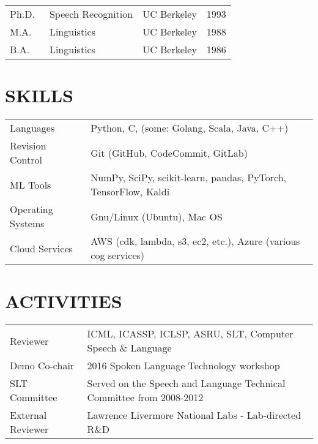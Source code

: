 \documentclass[11pt]{res} %
\newcommand{\mysection}[1]{%
	\pagebreak[0]\section{#1}\vspace{1em}
}
\begin{document}
\begin{resume}
\begin{tabular}{llcc}
  Ph.D.\ & Speech Recognition & UC Berkeley & 1993 \\[.5em]
  M.A.\ & Linguistics & UC Berkeley & 1988 \\[.5em]
  B.A.\ & Linguistics & UC Berkeley & 1986
\end{tabular}

 
\mysection{SKILLS}

\begin{tabular}{ll}
Languages & Python, C, (some: Golang, Scala, Java, C++)  \\[.5em]
Revision Control & Git (GitHub, CodeCommit, GitLab) \\[.5em]
ML Tools & NumPy, SciPy, scikit-learn, pandas, PyTorch, TensorFlow, Kaldi \\[.5em]
Operating Systems &	Gnu/Linux (Ubuntu), Mac OS \\[.5em]
Cloud Services & AWS (cdk, lambda, s3, ec2, etc.), Azure (various cog services)

\end{tabular}
	

\mysection{ACTIVITIES}

\begin{tabular}{ll}
  Reviewer & ICML, ICASSP, ICLSP, ASRU, SLT, Computer Speech \& Language \\[.5em]
  Demo Co-chair & 2016 Spoken Language Technology workshop \\[.5em]
  SLT Committee & Served on the Speech and Language Technical Committee from 2008-2012 \\[.5em]
  External Reviewer & Lawrence Livermore National Labs - Lab-directed R\&D 
\end{tabular}


%
\pagebreak[3]

\printbibliography[type=patent,title={PATENTS},heading=subbibliography]

\pagebreak[3]
\printbibliography[nottype=patent,title={PUBLICATIONS},heading=subbibliography]



\end{resume}
\end{document}
